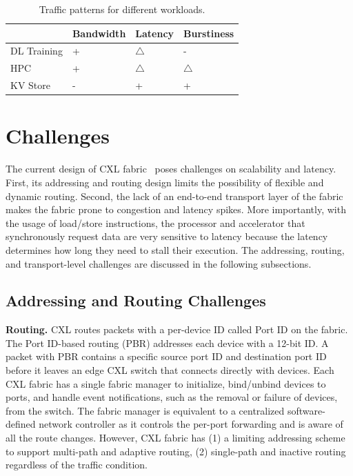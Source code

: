 \begin{table}[ht!]
\begin{tabular}{|l|l|l|l|}
\hline
            & Bandwidth & Latency & Burstiness         \\ \hline
DL Training & +         & $\triangle$    & -           \\ \hline
HPC         & +         & $\triangle$    & $\triangle$ \\ \hline
KV Store    & -         & +              & +           \\ \hline
\end{tabular}
\caption{Traffic patterns for different workloads.}
\label{tab:cxl-workload}
\end{table}

\section{Challenges}
%
The current design of CXL fabric~\cite{cxl-3-0-spec} poses challenges on scalability and latency. 
%
First, its addressing and routing design limits the possibility of flexible and dynamic routing. 
%
Second, the lack of an end-to-end transport layer of the fabric makes the fabric prone to congestion and latency spikes. 
%
More importantly, with the usage of load/store instructions, the processor and accelerator that synchronously request data are very sensitive to latency because the latency determines how long they need to stall their execution.
%
The addressing, routing, and transport-level challenges are discussed in the following subsections.  

\subsection{Addressing and Routing Challenges}
\label{sec:motivation:routing}

\noindent \textbf{Routing.}
CXL routes packets with a per-device ID called Port ID on the fabric. 
%
The Port ID-based routing (PBR) addresses each device with a 12-bit ID. 
%
A packet with PBR contains a specific source port ID and destination port ID before it leaves an edge CXL switch that connects directly with devices.
%
Each CXL fabric has a single fabric manager to initialize, bind/unbind devices to ports, and handle event notifications, such as the removal or failure of devices, from the switch.   
%
The fabric manager is equivalent to a centralized software-defined network controller as it controls the per-port forwarding and is aware of all the route changes. 
%
However, CXL fabric has (1) a limiting addressing scheme to support multi-path and adaptive routing, %
(2) single-path and inactive routing regardless of the traffic condition.

